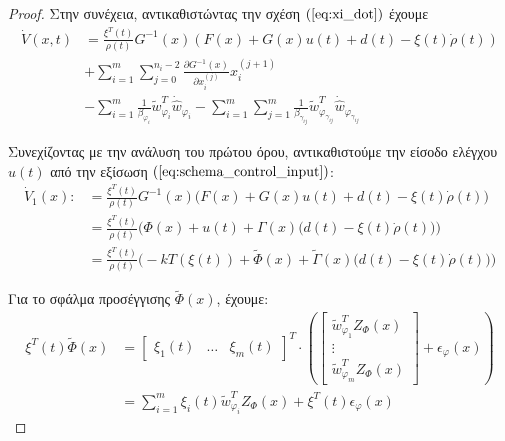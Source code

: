 \begin{proof}
Στην συνέχεια, αντικαθιστώντας την σχέση $(\ref{eq:xi_dot})$ έχουμε
\begin{equation}
	\begin{split}
	\dot{V}(x,t) &= 
	\frac{\xi^T(t)} {\rho(t)} G^{-1}(x) \left( F(x) + G(x)u(t) + d(t) - \xi(t)\dot{\rho}(t) \right)  \\
	&+ \sum_{i=1}^{m} \sum_{j=0}^{n_i - 2} 
	\frac{\partial G^{-1}(x) }{\partial x_i^{(j)}} x_i^{(j +1)}\\
	& - \sum_{i=1}^{m} \frac{1}{\beta_{\varphi_i} }
	\tilde{w}_{\varphi_i}^{T} \dot{\hat{w}}_{\varphi_i} 
	- \sum_{i=1}^{m} \sum_{j=1}^{m} \frac{1}{\beta_{\gamma_{ij}}}
	\tilde{w}_{\varphi_{\gamma_{ij}}}^{T} \dot{\hat{w}}_{\varphi_{\gamma_{ij}}}
	\end{split}
	\label{eq:scheme_lyap_derivative_2}
\end{equation}

Συνεχίζοντας με την ανάλυση του πρώτου όρου, αντικαθιστούμε την είσοδο ελέγχου $u(t)$ από την εξίσωση $(\ref{eq:schema_control_input})$:
\begin{equation*}
\begin{split}
	\dot{V}_1(x) :&= \frac{\xi^T(t)} {\rho(t)} G^{-1}(x) \Big( F(x) + G(x)u(t) + d(t) - \xi(t)\dot{\rho}(t) \Big)  \\
	 &=\frac{\xi^T(t)} {\rho(t)} \Big( \Phi(x) + u(t) 
	+  \Gamma(x) \big( d(t) - \xi(t)\dot{\rho}(t) \big)  \Big) \\
	 &=\frac{\xi^T(t)} {\rho(t)} \Big( -k T(\xi(t)) + \tilde{\Phi}(x) + \tilde{\Gamma}(x) \big( d(t) - \xi(t)\dot{\rho}(t) \big)  \Big)
\end{split}
\end{equation*}

Για το σφάλμα προσέγγισης $\tilde{\Phi}(x)$, έχουμε:
\begin{equation}
\begin{split}
	\xi^T(t) \tilde{\Phi}(x) &= 
	\begin{bmatrix}
	\xi_1(t) & \dots & \xi_m(t)
	\end{bmatrix}^T \cdot 
	\left(
	\begin{bmatrix}
	\tilde{w}_{\varphi_1}^{T} Z_{\varPhi}(x) \\
	\vdots \\
	\tilde{w}_{\varphi_m}^{T} Z_{\varPhi}(x) 
	\end{bmatrix}
	+ \epsilon_{\varphi}(x)
	\right) \\
	&= \sum_{i=1}^{m} \xi_i(t) \tilde{w}_{\varphi_i}^{T} Z_{\varPhi}(x) 
	  + \xi^T(t) \epsilon_{\varphi}(x)
\end{split}
\label{eq:phi_tilde_expand}
\end{equation}


\end{proof}
